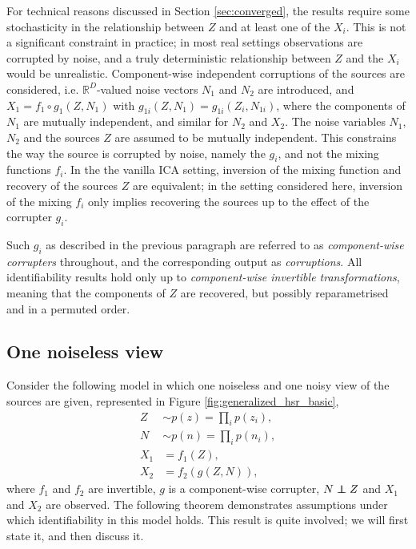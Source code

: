 For technical reasons discussed in Section
\ref{sec:converged}, the results require some stochasticity in the relationship between $Z$ and at least one of the $X_i$.
This is not a significant constraint in practice; in most real settings observations are corrupted by noise, and a truly deterministic relationship between $Z$ and the $X_i$ would be unrealistic.
Component-wise independent corruptions of the sources are considered, i.e. $\mathbb{R}^D$-valued noise vectors $N_1$ and $N_2$ are introduced, and $X_1 = f_1 \circ g_1(Z, N_1)$ with $g_{1i}(Z, N_1) = g_{1i}(Z_i, N_{1i})$, where the components of $N_{1}$ are mutually independent, and similar for $N_2$ and $X_2$. 
The noise variables $N_1$, $N_2$ and the sources $Z$ are assumed to be mutually independent.
This constrains the way the source is corrupted by noise, namely the $g_i$, and not the mixing functions $f_i$.
In the the vanilla ICA setting, inversion of the mixing function and recovery of the sources $Z$ are equivalent; in the setting considered here, inversion of the mixing $f_i$ only implies recovering the sources up to the effect of the corrupter $g_i$.

Such $g_i$ as described in the previous paragraph are referred to as \emph{component-wise corrupters} throughout, and the corresponding output as \emph{corruptions}. 
All identifiability results hold only up to \emph{component-wise invertible transformations}, meaning that the components of $Z$ are recovered, but possibly reparametrised and in a permuted order. 





\subsection{One noiseless view}
\label{sec:onenoisless}
Consider the following model in which one noiseless and one noisy view of the sources are given, represented in Figure \ref{fig:generalized_hsr_basic}, 
%
\begin{align}
Z &\sim p(z) = \prod_{i} p(z_i), \label{eq:indep}\\
N &\sim p(n) = \prod_{i} p(n_i), \nonumber  \\
X_{1}&= f_{1}(Z) \label{eq:sem2_1}, \\
X_{2}&= f_{2}( g(Z, N)) \label{eq:sem2_2},
\end{align}
%
where $f_1$ and $f_2$ are invertible, $g$ is a component-wise corrupter, $N \independent Z$ and $X_1$ and $X_2$ are observed.
The following theorem demonstrates assumptions under which identifiability in this model holds.
This result is quite involved; we will first state it, and then discuss it.

